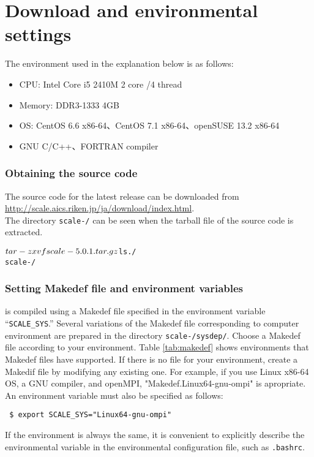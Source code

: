 \section{Download and environmental settings} \label{sec:scale_compile}

The environment used in the explanation below is as follows:
\begin{itemize}
\item CPU: Intel Core i5 2410M 2 core /4 thread
\item Memory: DDR3-1333 4GB
\item OS: CentOS 6.6 x86-64、CentOS 7.1 x86-64、openSUSE 13.2 x86-64
\item GNU C/C++、FORTRAN compiler %
\end{itemize}

\subsubsection{Obtaining the source code} %
The source code for the latest release can be downloaded
from \url{http://scale.aics.riken.jp/ja/download/index.html}.\\
The directory \texttt{scale-{\version}/} can be seen when the tarball file of the source code is extracted.
\begin{alltt}
 $ tar -zxvf scale-{\version}.tar.gz
 $ ls ./
    scale-{\version}/
\end{alltt}

\subsubsection{Setting Makedef file and environment variables} \label{subsec:environment}

\scalelib is compiled using a Makedef file
specified in the environment variable ``\verb|SCALE_SYS|.''
Several variations of the Makedef file corresponding to computer environment are prepared in the directory \texttt{scale-{\version}/sysdep/}.
Choose a Makedef file according to your environment.
Table \ref{tab:makedef} shows environments that Makedef files have supported. If there is no file for your environment, create a Makedif file by modifying any existing one.
For example,
if you use Linux x86-64 OS, a GNU compiler, and openMPI,
"Makedef.Linux64-gnu-ompi" is apropriate.
An environment variable must also be specified as follows:
\begin{verbatim}
 $ export SCALE_SYS="Linux64-gnu-ompi"
\end{verbatim}
If the environment is always the same, it is convenient to explicitly describe the environmental variable in the environmental configuration file, such as \verb|.bashrc|.

